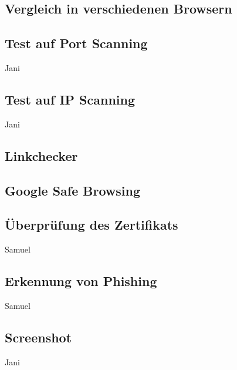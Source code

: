 \subsection{Vergleich in verschiedenen Browsern}


\subsection{Test auf Port Scanning}

\todo Jani

\subsection{Test auf IP Scanning}

\todo Jani

\subsection{Linkchecker}


\subsection{Google Safe Browsing}


\subsection{Überprüfung des Zertifikats}

\todo Samuel

\subsection{Erkennung von Phishing}

\todo Samuel

\subsection{Screenshot}

\todo Jani
